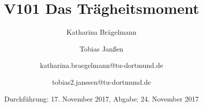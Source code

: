 
\title{V101 Das Trägheitsmoment}
\author{Katharina Brägelmann \and Tobias Janßen \and katharina.braegelmann@tu-dortmund.de \and tobias2.janssen@tu-dortmund.de}
\date{Durchführung: 17. November 2017, Abgabe: 24. November 2017}
\maketitle

\tableofcontents
